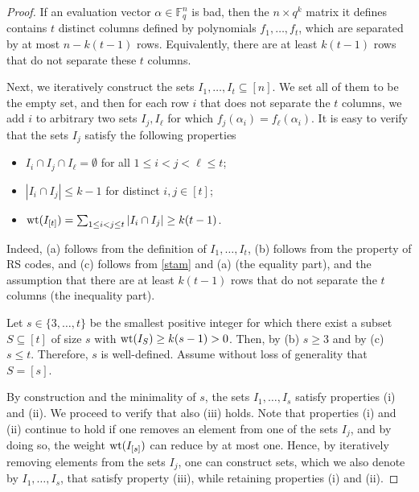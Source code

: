 \documentclass[11pt]{article}
\newcommand\black[1]{{\color{black} #1}}
\begin{document}
\begin{proof}
If an evaluation vector $\alpha\in\mathbb{F}_q^n$ is bad, then the $n\times q^k$ matrix it defines contains $t$ distinct columns defined by polynomials $f_1,\ldots,f_t$, which are  separated by at most $n-k(t-1)$ rows. Equivalently, there are at least  $k(t-1)$ rows that do not separate these $t$ columns.

Next, we iteratively construct  the sets $I_1,\ldots,I_t\subseteq [n]$. We set all of them to be the empty set, and then for each row $i$ that does not separate the $t$ columns, we add $i$ to arbitrary two sets $I_j,I_{\ell}$ for which $f_j(\alpha_i)=f_{\ell}(\alpha_i)$. It is easy to verify that the sets $I_j$ satisfy the following properties
\begin{itemize}
 \item [{\rm (a)}] $I_i\cap I_j\cap I_{\ell}=\emptyset$ for all $1\le i<j<\ell\le t$;
 \item [{\rm (b)}] $|I_i\cap I_j|\le k-1$ for distinct $i,j\in[t]$;
 \item [{\rm (c)}] ${\rm wt}(I_{[t]})=\sum_{1\le i<j\le t} |I_i\cap I_j|\geq k(t-1)$.
\end{itemize}

\noindent Indeed,  {\rm (a)}  follows from the definition of $I_1,\ldots,I_t$, {\rm (b)} follows from the property of RS codes, and {\rm (c)} follows from \eqref{stam} and {\rm (a)} (the equality part), \black{and the assumption that there are at least $k(t-1)$ rows that do not separate the $t$ columns (the inequality part)}.

Let \black{$s\in\{3,\ldots,t\}$} be the smallest positive integer  for which there exist a subset $S\subseteq [t]$ of size $s$ with  ${\rm wt}(I_{S})\ge k(s-1)>0$. \black{Then, by {\rm (b)} $s\ge 3$ and by {\rm (c)} $s\le t$. Therefore,} $s$ is well-defined. %
 Assume without loss of generality that $S=[s]$.

By construction and the minimality of $s$, the sets $I_1,\ldots, I_s$ satisfy properties {\rm (i)} and {\rm (ii)}. We proceed to verify that also  {\rm (iii)} holds. Note that properties {\rm (i)} and {\rm (ii)} continue to hold if one removes an element from one of the sets $I_j$, and by doing so,  the  weight ${\rm wt}(I_{[s]})$
    can reduce by at most one.   Hence, by iteratively removing elements from the sets $I_j$, one can construct sets, which we also denote by $I_1,\ldots, I_s$, that satisfy property {\rm (iii)}, while retaining properties {\rm (i)} and {\rm (ii)}.


\end{proof}
\end{document}
